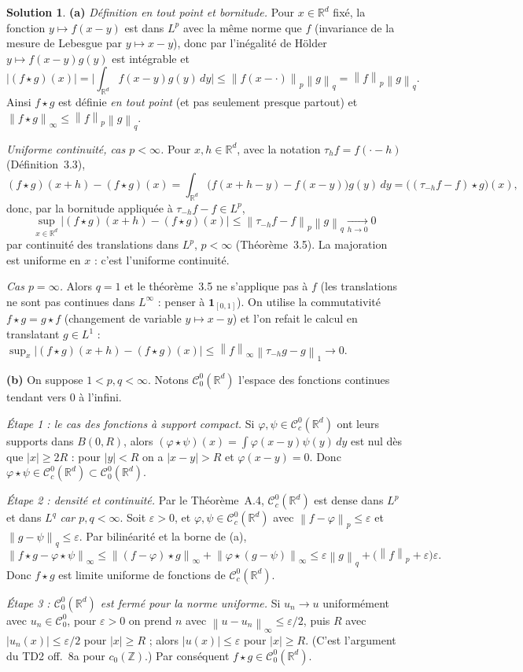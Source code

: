 \documentclass[11pt,a4paper]{article}
\newcommand{\R}{\mathbb{R}}
\newcommand{\Z}{\mathbb{Z}}
\newcommand{\norm}[1]{\left\|#1\right\|}
\newcommand{\Cz}{\mathcal{C}^0}
\newcommand{\Cc}{\mathcal{C}^0_c}
\theoremstyle{definition}
\newtheorem*{solution}{Solution}
\begin{document}
\begin{solution}
\noindent\textbf{(a)} \emph{Définition en tout point et bornitude.} Pour $x\in\R^d$ fixé, la fonction $y\mapsto f(x-y)$ est dans $L^p$ avec la même norme que $f$ (invariance de la mesure de Lebesgue par $y\mapsto x-y$), donc par l'inégalité de Hölder $y\mapsto f(x-y)g(y)$ est intégrable et
\[
|(f\star g)(x)|=\Big|\int_{\R^d}f(x-y)g(y)\,dy\Big|\le\norm{f(x-\cdot)}_p\norm g_q=\norm f_p\norm g_q .
\]
Ainsi $f\star g$ est définie \emph{en tout point} (et pas seulement presque partout) et $\norm{f\star g}_\infty\le\norm f_p\norm g_q$.

\emph{Uniforme continuité, cas $p<\infty$.} Pour $x,h\in\R^d$, avec la notation $\tau_hf=f(\cdot-h)$ (Définition~3.3),
\[
(f\star g)(x+h)-(f\star g)(x)=\int_{\R^d}\big(f(x+h-y)-f(x-y)\big)g(y)\,dy=\big((\tau_{-h}f-f)\star g\big)(x),
\]
donc, par la bornitude appliquée à $\tau_{-h}f-f\in L^p$,
\[
\sup_{x\in\R^d}|(f\star g)(x+h)-(f\star g)(x)|\le\norm{\tau_{-h}f-f}_p\norm g_q\xrightarrow[h\to0]{}0
\]
par continuité des translations dans $L^p$, $p<\infty$ (Théorème~3.5). La majoration est uniforme en $x$ : c'est l'uniforme continuité.

\emph{Cas $p=\infty$.} Alors $q=1$ et le théorème~3.5 ne s'applique pas à $f$ (les translations ne sont pas continues dans $L^\infty$ : penser à $\mathbf 1_{[0,1]}$). On utilise la commutativité $f\star g=g\star f$ (changement de variable $y\mapsto x-y$) et l'on refait le calcul en translatant $g\in L^1$ : $\sup_x|(f\star g)(x+h)-(f\star g)(x)|\le\norm f_\infty\norm{\tau_{-h}g-g}_1\to0$.

\medskip
\noindent\textbf{(b)} On suppose $1<p,q<\infty$. Notons $\Cz_0(\R^d)$ l'espace des fonctions continues tendant vers $0$ à l'infini.

\emph{Étape 1 : le cas des fonctions à support compact.} Si $\varphi,\psi\in\Cc(\R^d)$ ont leurs supports dans $B(0,R)$, alors $(\varphi\star\psi)(x)=\int\varphi(x-y)\psi(y)\,dy$ est nul dès que $|x|\ge2R$ : pour $|y|<R$ on a $|x-y|>R$ et $\varphi(x-y)=0$. Donc $\varphi\star\psi\in\Cc(\R^d)\subset\Cz_0(\R^d)$.

\emph{Étape 2 : densité et continuité.} Par le Théorème~A.4, $\Cc(\R^d)$ est dense dans $L^p$ et dans $L^q$ \emph{car $p,q<\infty$}. Soit $\varepsilon>0$, et $\varphi,\psi\in\Cc(\R^d)$ avec $\norm{f-\varphi}_p\le\varepsilon$ et $\norm{g-\psi}_q\le\varepsilon$. Par bilinéarité et la borne de (a),
\[
\norm{f\star g-\varphi\star\psi}_\infty\le\norm{(f-\varphi)\star g}_\infty+\norm{\varphi\star(g-\psi)}_\infty\le\varepsilon\norm g_q+\big(\norm f_p+\varepsilon\big)\varepsilon .
\]
Donc $f\star g$ est limite uniforme de fonctions de $\Cc(\R^d)$.

\emph{Étape 3 : $\Cz_0(\R^d)$ est fermé pour la norme uniforme.} Si $u_n\to u$ uniformément avec $u_n\in\Cz_0$, pour $\varepsilon>0$ on prend $n$ avec $\norm{u-u_n}_\infty\le\varepsilon/2$, puis $R$ avec $|u_n(x)|\le\varepsilon/2$ pour $|x|\ge R$ ; alors $|u(x)|\le\varepsilon$ pour $|x|\ge R$. (C'est l'argument du TD2 off.~8a pour $c_0(\Z)$.) Par conséquent $f\star g\in\Cz_0(\R^d)$.
\end{solution}
\end{document}
